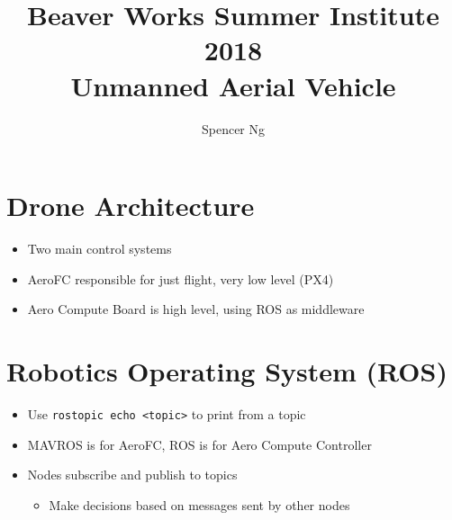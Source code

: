 \documentclass{article}
\title{Beaver Works Summer Institute 2018\\Unmanned Aerial Vehicle}
\author{Spencer Ng}
\date{}
\begin{document}
\maketitle
\section*{Drone Architecture}
\begin{itemize}
\item Two main control systems
		\item  AeroFC responsible for just flight, very low level (PX4)
		\item  Aero Compute Board is high level, using ROS as middleware

\end{itemize}

\section*{Robotics Operating System (ROS)}
\begin{itemize}
\item Use \verb|rostopic echo <topic>| to print from a topic
\item MAVROS is for AeroFC, ROS is for Aero Compute Controller
\item Nodes subscribe and publish to topics\begin{itemize}
\item Make decisions based on messages sent by other nodes
\end{itemize}
\end{itemize}
\end{document}
